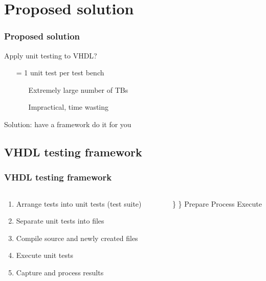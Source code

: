 \documentclass[british,10pt]{beamer}
\begin{document}
\section{Proposed solution}
\begin{frame}\frametitle{Proposed solution}
Apply unit testing to VHDL?
\begin{itemize}
\item[=] 1 unit test per test bench
\begin{itemize}
\item[\ding{222}] Extremely large number of TBs
\item[\ding{222}] Impractical, time wasting
\end{itemize}
\end{itemize}
\vskip5pt
Solution: have a framework do it for you
\end{frame}

\subsection{VHDL testing framework}
\begin{frame}\frametitle{VHDL testing framework}
\begin{columns}
\begin{column}{0.65\textwidth}
\begin{enumerate}
\item Arrange tests into unit tests (test suite)
\item Separate unit tests into files
\item Compile source and newly created files
\item Execute unit tests
\item Capture and process results
\end{enumerate}
\end{column}
\vskip12pt
\Huge\}
\vskip1pt
\}
 Prepare
\vskip13pt
 Process
\vskip17pt
 Execute
\end{columns}
\end{frame}
\end{document}
